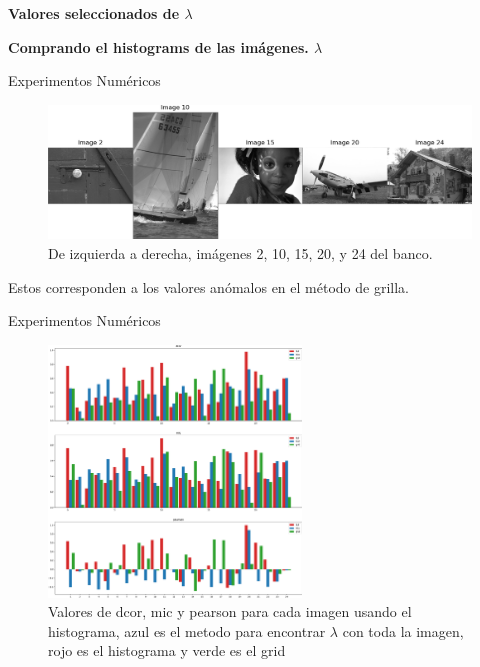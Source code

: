 \documentclass{beamer}
\begin{document}
\begin{frame}
    \begin{center}
        {\LARGE\bf Valores seleccionados de $\lambda$}
    \end{center}
    \begin{center}
        {\Large\bf Comprando el histograms de las imágenes. $\lambda$}
    \end{center}
\end{frame}

\begin{frame}{Experimentos Numéricos}
    \begin{figure}[H]
        \centering
        \includegraphics[width=\textwidth]{anomalies_grid.png}
        \caption{De izquierda a derecha, im\'agenes 2, 10, 15, 20, y 24 del banco.}
    \end{figure}
    Estos corresponden a los valores an\'omalos en el m\'etodo de grilla.
\end{frame}


\begin{frame}{Experimentos Numéricos}
    \begin{figure}[H]
        \centering
        \includegraphics[width=0.6\textwidth]{plot_comparison_hist.png}
        \caption{Valores de dcor, mic y pearson para cada imagen usando el histograma, azul es el metodo para encontrar $\lambda$ con toda la imagen, rojo es el histograma y verde es el grid}
    \end{figure}
\end{frame}
\end{document}

